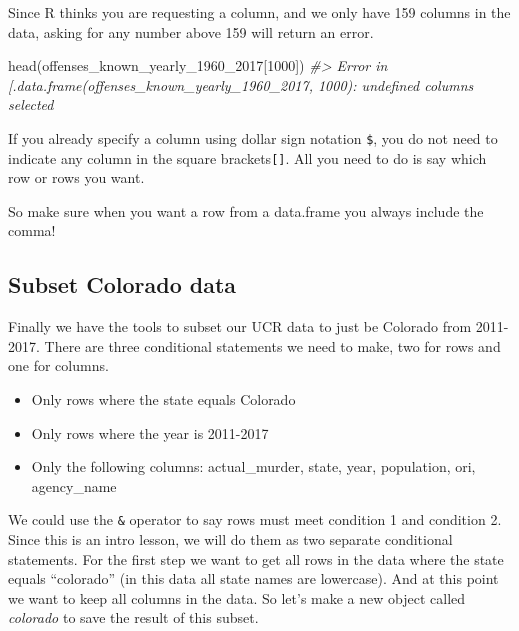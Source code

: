 \documentclass[
  12pt,
]{book}
\newenvironment{Shaded}{\begin{snugshade}}{\end{snugshade}}
\newcommand{\CommentTok}[1]{\textcolor[rgb]{0.37,0.37,0.37}{\textit{#1}}}
\newcommand{\DecValTok}[1]{\textcolor[rgb]{0.06,0.06,0.06}{#1}}
\newcommand{\FunctionTok}[1]{\textcolor[rgb]{0,0,0}{#1}}
\newcommand{\NormalTok}[1]{#1}
\newcommand{\SpecialCharTok}[1]{\textcolor[rgb]{0,0,0}{#1}}
\providecommand{\tightlist}{%
  \setlength{\itemsep}{0pt}\setlength{\parskip}{0pt}}
\begin{document}
Since R thinks you are requesting a column, and we only have 159 columns in the data, asking for any number above 159 will return an error.

\begin{Shaded}
\begin{Highlighting}[]
\FunctionTok{head}\NormalTok{(offenses\_known\_yearly\_1960\_2017[}\DecValTok{1000}\NormalTok{])}
\CommentTok{\#\textgreater{} Error in \textasciigrave{}[.data.frame\textasciigrave{}(offenses\_known\_yearly\_1960\_2017, 1000): undefined columns selected}
\end{Highlighting}
\end{Shaded}

If you already specify a column using dollar sign notation \texttt{\$}, you do not need to indicate any column in the square brackets\texttt{{[}{]}}. All you need to do is say which row or rows you want.

\begin{Shaded}
\end{Shaded}

So make sure when you want a row from a data.frame you always include the comma!

\hypertarget{subset-colorado-data}{%
\subsection{Subset Colorado data}\label{subset-colorado-data}}

Finally we have the tools to subset our UCR data to just be Colorado from 2011-2017. There are three conditional statements we need to make, two for rows and one for columns.

\begin{itemize}
\tightlist
\item
  Only rows where the state equals Colorado
\item
  Only rows where the year is 2011-2017
\item
  Only the following columns: actual\_murder, state, year, population, ori, agency\_name
\end{itemize}

We could use the \texttt{\&} operator to say rows must meet condition 1 and condition 2. Since this is an intro lesson, we will do them as two separate conditional statements. For the first step we want to get all rows in the data where the state equals ``colorado'' (in this data all state names are lowercase). And at this point we want to keep all columns in the data. So let's make a new object called \emph{colorado} to save the result of this subset.
\end{document}
